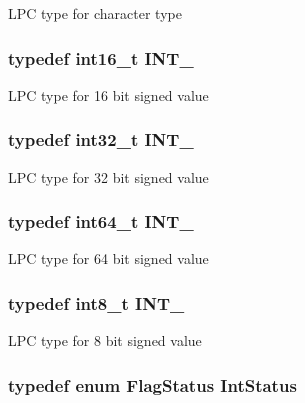 L\-P\-C type for character type \hypertarget{group__LPC__Types__Public__Types_gaae6e34a91bf60db05de64de7720df9a5}{
\subsubsection[{I\-N\-T\-\_\-16}]{\setlength{\rightskip}{0pt plus 5cm}typedef int16\-\_\-t {\bf I\-N\-T\-\_}}}\label{group__LPC__Types__Public__Types_gaae6e34a91bf60db05de64de7720df9a5}
L\-P\-C type for 16 bit signed value \hypertarget{group__LPC__Types__Public__Types_ga3a17614f3a1b67eaf20781d8ec16a652}{
\subsubsection[{I\-N\-T\-\_\-32}]{\setlength{\rightskip}{0pt plus 5cm}typedef int32\-\_\-t {\bf I\-N\-T\-\_}}}\label{group__LPC__Types__Public__Types_ga3a17614f3a1b67eaf20781d8ec16a652}
L\-P\-C type for 32 bit signed value \hypertarget{group__LPC__Types__Public__Types_ga1a0aab29eee6b306564084e005fa5750}{
\subsubsection[{I\-N\-T\-\_\-64}]{\setlength{\rightskip}{0pt plus 5cm}typedef int64\-\_\-t {\bf I\-N\-T\-\_}}}\label{group__LPC__Types__Public__Types_ga1a0aab29eee6b306564084e005fa5750}
L\-P\-C type for 64 bit signed value \hypertarget{group__LPC__Types__Public__Types_gac172005ce53b001f50a677cc10bd17b0}{
\subsubsection[{I\-N\-T\-\_\-8}]{\setlength{\rightskip}{0pt plus 5cm}typedef int8\-\_\-t {\bf I\-N\-T\-\_}}}\label{group__LPC__Types__Public__Types_gac172005ce53b001f50a677cc10bd17b0}
L\-P\-C type for 8 bit signed value \hypertarget{group__LPC__Types__Public__Types_gab7d263072f745b4f3913fb0afc434c4e}{
\subsubsection[{Int\-Status}]{\setlength{\rightskip}{0pt plus 5cm}typedef  enum {\bf Flag\-Status}  {\bf Int\-Status}}}\label{group__LPC__Types__Public__Types_gab7d263072f745b4f3913fb0afc434c4e}

